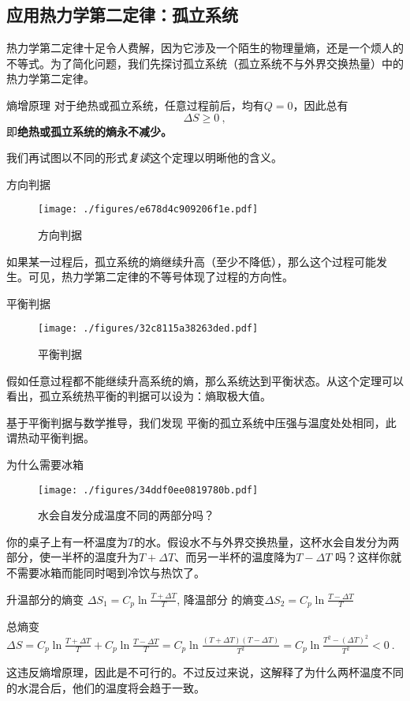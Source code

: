 \subsection{应用热力学第二定律：孤立系统}
热力学第二定律十足令人费解，因为它涉及一个陌生的物理量熵，还是一个烦人的不等式。为了简化问题，我们先探讨孤立系统（孤立系统不与外界交换热量）中的热力学第二定律。
\begin{corollary}{熵增原理}
对于绝热或孤立系统，任意过程前后，均有$Q=0$，因此总有 $$\Delta S \ge 0~,$$
即\textbf{绝热或孤立系统的熵永不减少。}
\end{corollary}
我们再试图以不同的形式\textsl{复读}这个定理以明晰他的含义。

\begin{corollary}{方向判据}
\begin{figure}[ht]
\centering
\texttt{[image: ./figures/e678d4c909206f1e.pdf]}
\caption{方向判据} \label{fig_Td2Law_1}
\end{figure}
如果某一过程后，孤立系统的熵继续升高（至少不降低），那么这个过程可能发生。可见，热力学第二定律的不等号体现了过程的方向性。
\end{corollary}

\begin{corollary}{平衡判据}
\begin{figure}[ht]
\centering
\texttt{[image: ./figures/32c8115a38263ded.pdf]}
\caption{平衡判据} \label{fig_Td2Law_2}
\end{figure}
假如任意过程都不能继续升高系统的熵，那么系统达到平衡状态。从这个定理可以看出，孤立系统热平衡的判据可以设为：熵取极大值。

基于平衡判据与数学推导，我们发现 平衡的孤立系统中压强与温度处处相同，此谓热动平衡判据。
\end{corollary}

\begin{example}{为什么需要冰箱}
\begin{figure}[ht]
\centering
\texttt{[image: ./figures/34ddf0ee0819780b.pdf]}
\caption{水会自发分成温度不同的两部分吗？} \label{fig_Td2Law_5}
\end{figure}
你的桌子上有一杯温度为$T$的水。假设水不与外界交换热量，这杯水会自发分为两部分，使一半杯的温度升为$T+\Delta T$、而另一半杯的温度降为$T-\Delta T$ 吗？这样你就不需要冰箱而能同时喝到冷饮与热饮了。

升温部分的熵变 $\Delta S_1=C_p \ln \frac{T+\Delta T}{T}$, 降温部分 的熵变$\Delta S_2=C_p \ln \frac{T-\Delta T}{T}$

总熵变 $\Delta S = C_p \ln \frac{T+\Delta T}{T} + C_p \ln \frac{T-\Delta T}{T} = C_p \ln \frac{(T+\Delta T)(T-\Delta T)}{T^2}= C_p \ln \frac{T^2 - (\Delta T)^2}{T^2}<0~.$

这违反熵增原理，因此是不可行的。不过反过来说，这解释了为什么两杯温度不同的水混合后，他们的温度将会趋于一致。
\end{example}

